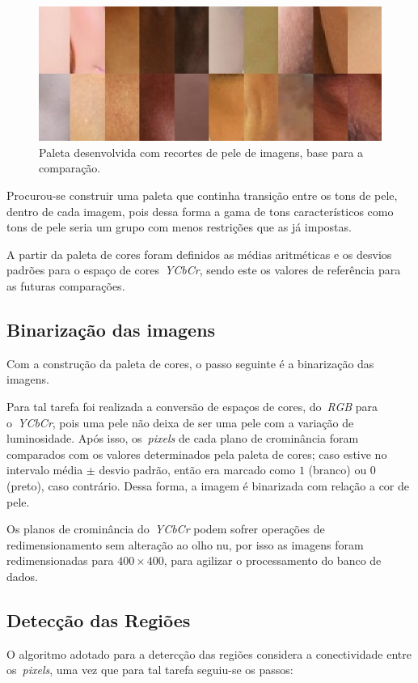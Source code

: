 \documentclass[conference]{Trabalho_1}
\begin{document}
\begin{figure}[!t]
  \centering
  \includegraphics[width = 4.5 cm]{Paleta}
  \caption{Paleta desenvolvida com recortes de pele de imagens, base para a compara\c{c}\~ao.}
  \label{fig:paleta}
\end{figure}

Procurou-se construir uma paleta que continha transi\c{c}\~ao entre os tons de pele, dentro de cada imagem, pois dessa forma a gama de tons caracter\'isticos como tons de pele seria um grupo com menos restri\c{c}\~oes que as j\'a impostas.

A partir da paleta de cores foram definidos as m\'edias aritm\'eticas e os desvios padr\~oes para o espa\c{c}o de cores~\textit{YCbCr}, sendo este os valores de refer\^encia para as futuras compara\c{c}\~oes.

\subsection{Binariza\c{c}\~ao das imagens}
Com a constru\c{c}\~ao da paleta de cores, o passo seguinte \'e a binariza\c{c}\~ao das imagens.

Para tal tarefa foi realizada a convers\~ao de espa\c{c}os de cores, do~\textit{RGB} para o~\textit{YCbCr}, pois uma pele n\~ao deixa de ser uma pele com a varia\c{c}\~ao de luminosidade. Ap\'os isso, os~\textit{pixels} de cada plano de cromin\^ancia foram comparados com os valores determinados pela paleta de cores; caso estive no intervalo m\'edia $\pm$ desvio padr\~ao, ent\~ao era marcado como $1$ (branco) ou $0$ (preto), caso contr\'ario. Dessa forma, a imagem \'e binarizada com rela\c{c}\~ao a cor de pele.

Os planos de cromin\^ancia do~\textit{YCbCr} podem sofrer opera\c{c}\~oes de redimensionamento sem altera\c{c}\~ao ao olho nu, por isso as imagens foram redimensionadas para $400 \times 400$, para agilizar o processamento do banco de dados.

\subsection{Detec\c{c}\~ao das Regi\~oes}
O algoritmo adotado para a deterc\c{c}\~ao das regi\~oes considera a conectividade entre os~\textit{pixels}, uma vez que para tal tarefa seguiu-se os passos:
\end{document}
